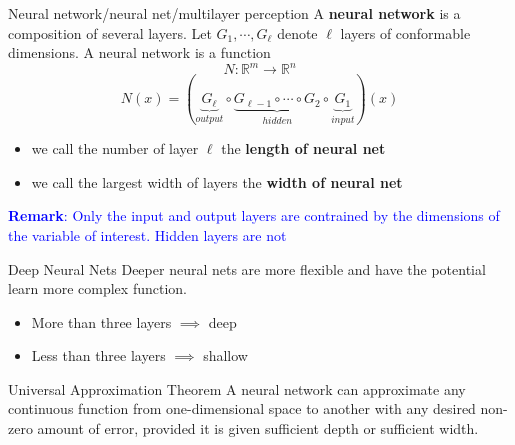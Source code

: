 \documentclass[aspectratio=169]{beamer} %
\begin{document}
\begin{frame}{Neural network/neural net/multilayer perception}
    A \textbf{neural network} is a composition of several layers. Let $G_1,\cdots, G_\ell$ denote $\ell$ layers of conformable dimensions. A neural network is a function
    $$
    N:\mathbb{R}^m \to \mathbb{R}^n
    $$
    $$
    N(x) = (\underbrace{G_\ell}_{output} \circ \underbrace{G_{\ell-1} \circ \cdots\circ G_2}_{hidden}\circ \underbrace{G_1}_{input})(x)
    $$

    \begin{itemize}
        \item we call the number of layer $\ell$ the \textbf{length of neural net}
        \item we call the largest width of layers the \textbf{width of neural net}
    \end{itemize}
    \textcolor{blue}{\textbf{Remark}: Only the input and output layers are contrained by the dimensions of the variable of interest. Hidden layers are not}
\end{frame}
\begin{frame}{Deep Neural Nets}
Deeper neural nets are more flexible and have the potential learn more complex function.
    \begin{itemize}
        \item More than three layers $\implies$ deep
        \item Less than three layers $\implies$ shallow 
    \end{itemize}
\end{frame}

\begin{frame}{Universal Approximation Theorem}
A neural network can approximate any continuous function from one-dimensional space to another with any desired non-zero amount of error, provided it is given sufficient depth or sufficient width.
    
\end{frame}
\end{document}
